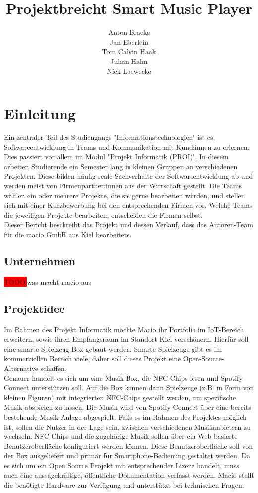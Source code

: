 \documentclass[10pt, a4paper, draft]{article}
\title{Projektbreicht Smart Music Player}
\author{Anton Bracke\\Jan Eberlein\\Tom Calvin Haak\\Julian Hahn\\Nick Loewecke}
\begin{document}
\maketitle
\newpage
\tableofcontents
\newpage

\section{Einleitung}
Ein zentraler Teil des Studiengangs "Informationstechnologien" ist es, Softwareentwicklung in Teams und Kommunikation mit Kund:innen zu erlernen. \cite{Qualifikationsziele_Informationstechnologien}
Dies passiert vor allem im Modul "Projekt Informatik (PROI)".
In diesem arbeiten Studierende ein Semester lang in kleinen Gruppen an verschiedenen Projekten.
Diese bilden häufig reale Sachverhalte der Softwareentwicklung ab und werden meist von Firmenpartner:innen aus der Wirtschaft gestellt.
Die Teams wählen ein oder mehrere Projekte, die sie gerne bearbeiten würden, und stellen sich mit einer Kurzbewerbung bei den entsprechenden Firmen vor.
Welche Teams die jeweiligen Projekte bearbeiten, entscheiden die Firmen selbst.
\\
Dieser Bericht beschreibt das Projekt und dessen Verlauf, dass das Autoren-Team für die macio GmbH aus Kiel bearbeitete.

\subsection{Unternehmen}
\colorbox{red}{TODO:}was macht macio aus
\subsection{Projektidee}
Im Rahmen des Projekt Informatik möchte Macio ihr Portfolio im IoT-Bereich erweitern, sowie ihren Empfangsraum im Standort Kiel verschönern.
Hierfür soll eine smarte Spielzeug-Box gebaut werden.
Smarte Spielzeuge gibt es im kommerziellen Bereich viele, daher soll dieses Projekt eine Open-Source-Alternative schaffen.\\
Genauer handelt es sich um eine Musik-Box, die NFC-Chips lesen und Spotify Connect unterstützen soll.
Auf die Box können dann Spielzeuge (z.B. in Form von kleinen Figuren) mit integrierten NFC-Chips gestellt werden, um spezifische Musik abspielen zu lassen.
Die Musik wird von Spotify-Connect über eine bereits bestehende Musik-Anlage abgespielt.
Falls es im Rahmen des Projektes möglich ist, sollen die Nutzer in der Lage sein, zwischen verschiedenen Musikanbietern zu wechseln.
NFC-Chips und die zugehörige Musik sollen über ein Web-basierte Benutzeroberfläche konfiguriert werden können.
Diese Benutzeroberfläche soll von der Box ausgeliefert und primär für Smartphone-Bedienung gestaltet werden.
Da es sich um ein Open Source Projekt mit entsprechender Lizenz handelt, muss auch eine aussagekräftige, öffentliche Dokumentation verfasst werden.
Macio stellt die benötigte Hardware zur Verfügung und unterstützt bei technischen Fragen.
\end{document}
